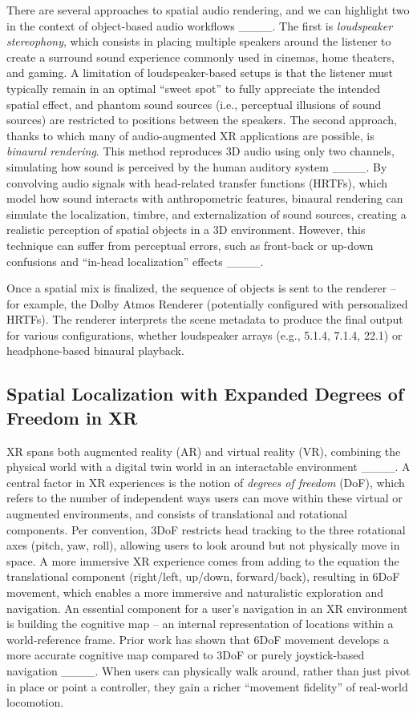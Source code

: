 There are several approaches to spatial audio rendering, and we can highlight two in the context of object-based audio workflows ____. The first is \emph{loudspeaker stereophony}, which consists in placing multiple speakers around the listener to create a surround sound experience commonly used in cinemas, home theaters, and gaming. A limitation of loudspeaker-based setups is that the listener must typically remain in an optimal \enquote{sweet spot} to fully appreciate the intended spatial effect, and phantom sound sources (i.e., perceptual illusions of sound sources) are restricted to positions between the speakers. The second approach, thanks to which many of audio-augmented XR applications are possible, is \emph{binaural rendering}. This method reproduces 3D audio using only two channels, simulating how sound is perceived by the human auditory system ____. By convolving audio signals with head-related transfer functions (HRTFs), which model how sound interacts with anthropometric features, binaural rendering can simulate the localization, timbre, and externalization of sound sources, creating a realistic perception of spatial objects in a 3D environment.
However, this technique can suffer from perceptual errors, such as front-back or up-down confusions and \enquote{in-head localization} effects ____. 

Once a spatial mix is finalized, the sequence of objects is sent to the renderer -- for example, the Dolby Atmos Renderer (potentially configured with personalized HRTFs). The renderer interprets the scene metadata to produce the final output for various configurations, whether loudspeaker arrays (e.g., 5.1.4, 7.1.4, 22.1) or headphone-based binaural playback. 

\subsection{Spatial Localization with Expanded Degrees of Freedom in XR}

XR spans both augmented reality (AR) and virtual reality (VR), combining the physical world with a digital twin world in an interactable environment ____. A central factor in XR experiences is the notion of \emph{degrees of freedom} (DoF), which refers to the number of independent ways users can move within these virtual or augmented environments, and consists of translational and rotational components. Per convention, 3DoF restricts head tracking to the three rotational axes (pitch, yaw, roll), allowing users to look around but not physically move in space. A more immersive XR experience comes from adding to the equation the translational component (right/left, up/down, forward/back), resulting in 6DoF movement, which enables a more immersive and naturalistic exploration and navigation. An essential component for a user's navigation in an XR environment is building the cognitive map -- an internal representation of locations within a world-reference frame. Prior work has shown that 6DoF movement develops a more accurate cognitive map compared to 3DoF or purely joystick-based navigation ____. When users can physically walk around, rather than just pivot in place or point a controller, they gain a richer \enquote{movement fidelity} of real-world locomotion. 

